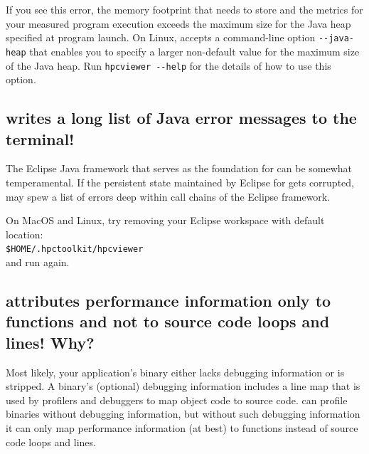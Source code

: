 \documentclass[11pt,twoside,letterpaper]{report}
\begin{document}
If you see this error, the memory footprint that \hpcviewer{} needs to store and the metrics for your measured program execution exceeds the maximum size for the Java heap specified at program launch.  On Linux, \hpcviewer{} accepts a command-line option \verb|--java-heap| that enables you to specify a larger non-default value for the maximum size of the Java heap. Run \verb|hpcviewer --help| for the details of how to use this option.



\subsection{\hpcviewer{} writes a long list of Java error messages to the terminal!}

The Eclipse Java framework that serves as the foundation for \hpcviewer{} can be somewhat temperamental. If the persistent state maintained by Eclipse for \hpcviewer{}
gets corrupted, \hpcviewer{} may spew a list of errors deep within call chains of the Eclipse framework.

On MacOS and Linux, try removing your \hpcviewer{} Eclipse workspace with default location:\\
 \texttt{\$HOME/.hpctoolkit/hpcviewer} \\
 and run \hpcviewer{} again.



\subsection{\hpcviewer{} attributes performance information only to functions and not to source code loops and lines! Why?}
\label{sec:troubleshooting:debug-info}

Most likely, your application's binary either lacks debugging information or is stripped.
A binary's (optional) debugging information includes a line map that is used by profilers and debuggers to map object code to source code.
\HPCToolkit{} can profile binaries without debugging information, but without such debugging information it can only map performance information (at best) to functions instead of source code loops and lines.
\end{document}
